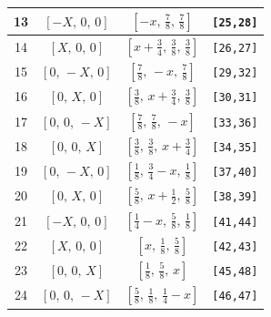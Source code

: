 \documentclass[fleqn,8pt]{jsarticle}
\begin{document}
\begin{longtable}{cccc}
13 & $\left[ - X,\, 0,\, 0 \right]$ & $\left[ - x,\, \frac{7}{8},\, \frac{7}{8} \right]$ & {\tt [25,28]} \\ \hline
14 & $\left[ X,\, 0,\, 0 \right]$ & $\left[ x + \frac{3}{4},\, \frac{3}{8},\, \frac{3}{8} \right]$ & {\tt [26,27]} \\ \hline
15 & $\left[ 0,\, - X,\, 0 \right]$ & $\left[ \frac{7}{8},\, - x,\, \frac{7}{8} \right]$ & {\tt [29,32]} \\ \hline
16 & $\left[ 0,\, X,\, 0 \right]$ & $\left[ \frac{3}{8},\, x + \frac{3}{4},\, \frac{3}{8} \right]$ & {\tt [30,31]} \\ \hline
17 & $\left[ 0,\, 0,\, - X \right]$ & $\left[ \frac{7}{8},\, \frac{7}{8},\, - x \right]$ & {\tt [33,36]} \\ \hline
18 & $\left[ 0,\, 0,\, X \right]$ & $\left[ \frac{3}{8},\, \frac{3}{8},\, x + \frac{3}{4} \right]$ & {\tt [34,35]} \\ \hline
19 & $\left[ 0,\, - X,\, 0 \right]$ & $\left[ \frac{1}{8},\, \frac{3}{4} - x,\, \frac{1}{8} \right]$ & {\tt [37,40]} \\ \hline
20 & $\left[ 0,\, X,\, 0 \right]$ & $\left[ \frac{5}{8},\, x + \frac{1}{2},\, \frac{5}{8} \right]$ & {\tt [38,39]} \\ \hline
21 & $\left[ - X,\, 0,\, 0 \right]$ & $\left[ \frac{1}{4} - x,\, \frac{5}{8},\, \frac{1}{8} \right]$ & {\tt [41,44]} \\ \hline
22 & $\left[ X,\, 0,\, 0 \right]$ & $\left[ x,\, \frac{1}{8},\, \frac{5}{8} \right]$ & {\tt [42,43]} \\ \hline
23 & $\left[ 0,\, 0,\, X \right]$ & $\left[ \frac{1}{8},\, \frac{5}{8},\, x \right]$ & {\tt [45,48]} \\ \hline
24 & $\left[ 0,\, 0,\, - X \right]$ & $\left[ \frac{5}{8},\, \frac{1}{8},\, \frac{1}{4} - x \right]$ & {\tt [46,47]} \\
\end{longtable}
\renewcommand{\arraystretch}{1.2}
\end{document}
